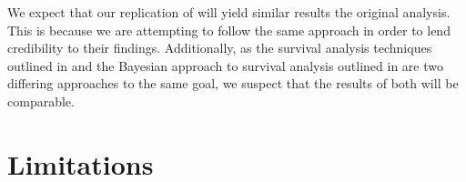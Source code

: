 \documentclass[conference]{IEEEtran}
\begin{document}
We expect that our replication of \cite{ali2020cheating} will yield similar results the original analysis. This is because we are attempting to follow the same approach in order to lend credibility to their findings. Additionally, as the survival analysis techniques outlined in \cite{ali2020cheating} and the Bayesian approach to survival analysis outlined in \cite{kelter2020bayesian} are two differing approaches to the same goal, we suspect that the results of both will be comparable.

\section{Limitations}




\end{document}
